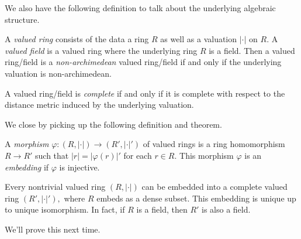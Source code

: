 We also have the following definition to talk about the underlying algebraic structure.
\begin{definition}
	A \textit{valued ring} consists of the data a ring $R$ as well as a valuation $|\cdot|$ on $R.$ A \textit{valued field} is a valued ring where the underlying ring $R$ is a field. Then a valued ring/field is a \textit{non-archimedean} valued ring/field if and only if the underlying valuation is non-archimedean.
\end{definition}
\begin{definition}
	A valued ring/field is \textit{complete} if and only if it is complete with respect to the distance metric induced by the underlying valuation.
\end{definition}
We close by picking up the following definition and theorem.
\begin{definition}
	A \textit{morphism} $\varphi:(R,|\cdot|)\to(R',|\cdot|')$ of valued rings is a ring homomorphism $R\to R'$ such that $|r|=|\varphi(r)|'$ for each $r\in R.$ This morphism $\varphi$ is an \textit{embedding} if $\varphi$ is injective.
\end{definition}
\begin{theorem}
	Every nontrivial valued ring $(R,|\cdot|)$ can be embedded into a complete valued ring $(R',|\cdot|'),$ where $R$ embeds as a dense subset. This embedding is unique up to unique isomorphism. In fact, if $R$ is a field, then $R'$ is also a field.
\end{theorem}
We'll prove this next time.